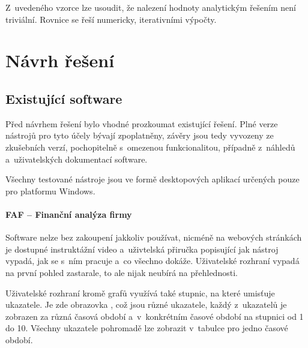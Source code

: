 Z~uvedeného vzorce lze usoudit, že nalezení hodnoty analytickým řešením není triviální. Rovnice se řeší numericky, iterativními výpočty.















































\chapter{Návrh řešení}



\section{Existující software}
Před návrhem řešení bylo vhodné prozkoumat existující řešení. Plné verze nástrojů pro tyto účely bývají zpoplatněny, závěry jsou tedy vyvozeny ze zkušebních verzí, pochopitelně s~omezenou funkcionalitou, případně z~náhledů a~uživatelských dokumentací software.

Všechny testované nástroje jsou ve formě desktopových aplikací určených pouze pro platformu Windows.

\subsubsection{FAF -- Finanční analýza firmy}
Software nelze bez zakoupení jakkoliv používat, nicméně na webových stránkách je dostupné instruktážní video a~uživtelská přiručka popisující jak nástroj vypadá, jak se s~ním pracuje a~co všechno dokáže. Uživatelské rozhraní vypadá na první pohled zastarale, to ale nijak neubírá na přehlednosti.

Uživatelské rozhraní kromě grafů využívá také stupnic, na které umisťuje ukazatele. Je zde obrazovka , což jsou různé ukazatele, každý z~ukazatelů je zobrazen za různá časová období a~v~konkrétním časové období na stupnici od 1 do 10. Všechny ukazatele pohromadě lze zobrazit v~tabulce pro jedno časové období.

